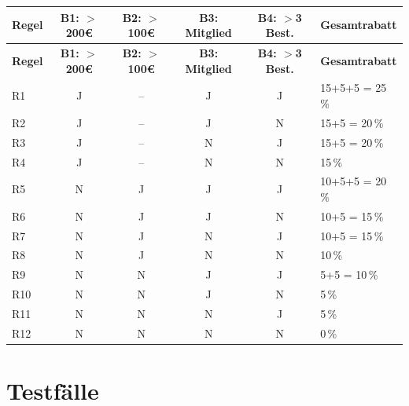 \documentclass[
	fontsize=12pt,          %
	paper=a4,               %
	numbers=noenddot,       %
	listof=totoc,           %
	listof=entryprefix,     %
	listof=nochaptergap,    %
	bibliography=totoc,     %
	parskip=half,           %
	openany                 %
]{scrbook}
\begin{document}
\begin{longtable}{| p{0.8cm} | c | c | c | c | p{2.5cm} |}
	\hline
	\textbf{Regel} & \textbf{B1: $>$200€} & \textbf{B2: $>$100€} & \textbf{B3: Mitglied} & \textbf{B4: $>$3 Best.} & \textbf{Gesamtrabatt} \\ \hline
	\endfirsthead
	\hline
	\textbf{Regel} & \textbf{B1: $>$200€} & \textbf{B2: $>$100€} & \textbf{B3: Mitglied} & \textbf{B4: $>$3 Best.} & \textbf{Gesamtrabatt} \\ \hline
	\endhead
	\hline
	\endfoot
	R1 & J & -- & J & J & 15+5+5 = 25\,\% \\ \hline
	R2 & J & -- & J & N & 15+5 = 20\,\% \\ \hline
	R3 & J & -- & N & J & 15+5 = 20\,\% \\ \hline
	R4 & J & -- & N & N & 15\,\% \\ \hline
	R5 & N & J & J & J & 10+5+5 = 20\,\% \\ \hline
	R6 & N & J & J & N & 10+5 = 15\,\% \\ \hline
	R7 & N & J & N & J & 10+5 = 15\,\% \\ \hline
	R8 & N & J & N & N & 10\,\% \\ \hline
	R9 & N & N & J & J & 5+5 = 10\,\% \\ \hline
	R10 & N & N & J & N & 5\,\% \\ \hline
	R11 & N & N & N & J & 5\,\% \\ \hline
	R12 & N & N & N & N & 0\,\% \\ \hline
\end{longtable}

\section*{Testfälle}
\end{document}
